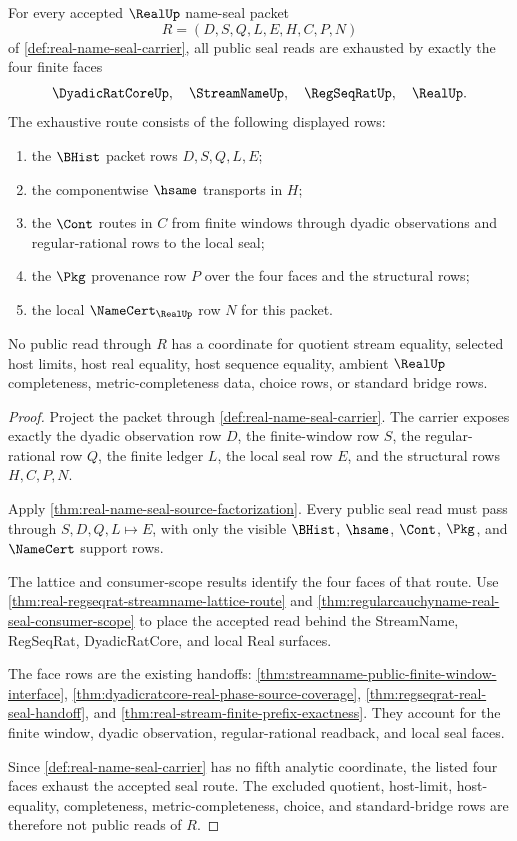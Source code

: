 \begin{theorem}
\label{thm:real-name-seal-four-face-coverage}
For every accepted $\RealUp$ name-seal packet
$$
R=(D,S,Q,L,E,H,C,P,N)
$$
of \autoref{def:real-name-seal-carrier}, all public seal reads are exhausted by exactly the four finite faces
$$
\DyadicRatCoreUp,\quad \StreamNameUp,\quad \RegSeqRatUp,\quad \RealUp.
$$
The exhaustive route consists of the following displayed rows:
\begin{enumerate}
\item the $\BHist$ packet rows $D,S,Q,L,E$;
\item the componentwise $\hsame$ transports in $H$;
\item the $\Cont$ routes in $C$ from finite windows through dyadic observations and regular-rational rows to the local seal;
\item the $\Pkg$ provenance row $P$ over the four faces and the structural rows;
\item the local $\NameCert_{\RealUp}$ row $N$ for this packet.
\end{enumerate}
No public read through $R$ has a coordinate for quotient stream equality, selected host limits, host real equality, host sequence equality, ambient $\RealUp$ completeness, metric-completeness data, choice rows, or standard bridge rows.
\end{theorem}
\begin{proof}
Project the packet through \autoref{def:real-name-seal-carrier}. The carrier exposes exactly the dyadic observation row $D$, the finite-window row $S$, the regular-rational row $Q$, the finite ledger $L$, the local seal row $E$, and the structural rows $H,C,P,N$.

Apply \autoref{thm:real-name-seal-source-factorization}. Every public seal read must pass through $S,D,Q,L \longmapsto E$, with only the visible $\BHist$, $\hsame$, $\Cont$, $\Pkg$, and $\NameCert$ support rows.

The lattice and consumer-scope results identify the four faces of that route. Use \autoref{thm:real-regseqrat-streamname-lattice-route} and \autoref{thm:regularcauchyname-real-seal-consumer-scope} to place the accepted read behind the StreamName, RegSeqRat, DyadicRatCore, and local Real surfaces.

The face rows are the existing handoffs: \autoref{thm:streamname-public-finite-window-interface}, \autoref{thm:dyadicratcore-real-phase-source-coverage}, \autoref{thm:regseqrat-real-seal-handoff}, and \autoref{thm:real-stream-finite-prefix-exactness}. They account for the finite window, dyadic observation, regular-rational readback, and local seal faces.

Since \autoref{def:real-name-seal-carrier} has no fifth analytic coordinate, the listed four faces exhaust the accepted seal route. The excluded quotient, host-limit, host-equality, completeness, metric-completeness, choice, and standard-bridge rows are therefore not public reads of $R$.
\end{proof}

